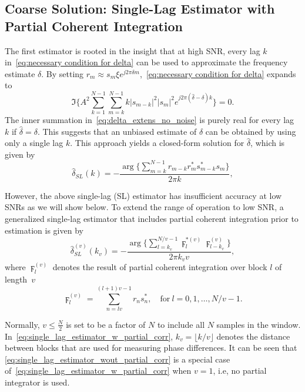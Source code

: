 \subsection{Coarse Solution: Single-Lag Estimator with Partial
  Coherent Integration}

The first estimator is rooted in the insight that at high SNR,
every lag $k$ in~\eqref{eq:necessary condition for delta}
can be used to approximate the frequency estimate $\delta$.
By setting $r_m\approx s_m\xi e^{j2\pi\delta m}$,~\eqref{eq:necessary condition for delta} expands to
\begin{equation}
  \label{eq:delta_extens_no_noise}
  \Im\bigg\{A^2\sum_{k=1}^{N-1}\sum_{m=k}^{N-1}k|s_{m-k}|^2|s_m|^2e^{j2\pi (\hat{\delta}-\delta)k}\bigg\}=0.
  \end{equation}
The inner summation in~\eqref{eq:delta_extens_no_noise} is purely real for every lag $k$ if $\hat{\delta}=\delta$.
This suggests that an unbiased estimate of $\delta$ can be obtained by
using only a single lag $k$.
This approach yields
a closed-form solution for $\hat{\delta}$, which is given by
\begin{equation}
  \label{eq:single_lag_estimator_wout_partial_corr}
  \hat{\delta}_{SL}(k)=-\frac{\arg\big\{\sum_{m=k}^{N-1}r_{m-k}r_m^*s_{m-k}^*s_m\big\}}{2\pi k},
\end{equation}

However, the above single-lag (SL) estimator has insufficient
accuracy at low SNRs as we will show below.
To extend the range of operation to low SNR,
a generalized single-lag estimator that includes partial coherent integration
prior to estimation is given by
\begin{equation}
  \label{eq:single_lag_estimator_w_partial_corr}
  \hat{\delta}_{SL}^{(v)}(k_v)=-\frac{\arg\big\{\sum_{l=k_v}^{N/v-1}\digamma_l^{*(v)}\digamma_{l-k_v}^{(v)}\big\}}{2\pi k_vv},
\end{equation}
where $\digamma_{l}^{(v)}$ denotes the result of partial coherent integration over block $l$
of length~$v$
\begin{equation}
  \label{eq:coherent_integrator}
  \digamma_l^{(v)}=\sum_{n=lv}^{(l+1)v-1}r_ns_n^*, \quad \text{for}~l=0,1,\ldots,N/v{-}1.
\end{equation}

Normally, $v \leq \frac{N}{2}$ is set to be a factor of $N$ to include
all $N$ samples in the window.
In~\eqref{eq:single_lag_estimator_w_partial_corr}, $k_v=\lfloor k/v \rfloor$ denotes
the distance between blocks that are used for measuring phase differences.
It can be seen that 
\eqref{eq:single_lag_estimator_wout_partial_corr} is a special case of~\eqref{eq:single_lag_estimator_w_partial_corr}
when $v=1$, i.e,  no partial integrator is used.

